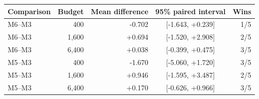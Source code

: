 \begin{tabular}{lrrcr}\toprule
Comparison & Budget & Mean difference & 95\% paired interval & Wins\\\midrule
M6--M3 & 400 & -0.702 & [-1.643, +0.239] & 1/5\\
M6--M3 & 1,600 & +0.694 & [-1.520, +2.908] & 2/5\\
M6--M3 & 6,400 & +0.038 & [-0.399, +0.475] & 3/5\\
M5--M3 & 400 & -1.670 & [-5.060, +1.720] & 3/5\\
M5--M3 & 1,600 & +0.946 & [-1.595, +3.487] & 2/5\\
M5--M3 & 6,400 & +0.170 & [-0.626, +0.966] & 3/5\\
\bottomrule\end{tabular}
